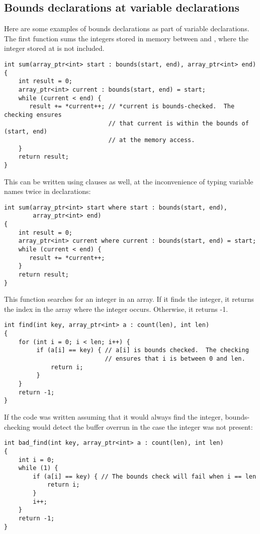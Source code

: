 \subsection{Bounds declarations at variable declarations}
\label{section:variable-declarations}

Here are some examples of bounds declarations as part of variable
declarations. The first function sums the integers stored in memory
between  and , where the integer stored at
 is not included.

\begin{lstlisting}
int sum(array_ptr<int> start : bounds(start, end), array_ptr<int> end)
{
    int result = 0;
    array_ptr<int> current : bounds(start, end) = start;
    while (current < end) {
       result += *current++; // *current is bounds-checked.  The checking ensures
                             // that current is within the bounds of (start, end)
                             // at the memory access.
    }
    return result;
}
\end{lstlisting}

This can be written using  clauses as well, at the
inconvenience of typing variable names twice in declarations:

\begin{lstlisting}
int sum(array_ptr<int> start where start : bounds(start, end),
        array_ptr<int> end)
{
    int result = 0;
    array_ptr<int> current where current : bounds(start, end) = start;
    while (current < end) {
       result += *current++;
    }
    return result;
}
\end{lstlisting}

This function searches for an integer in an array. If it finds the
integer, it returns the index in the array where the integer occurs.
Otherwise, it returns -1.

\begin{lstlisting}
int find(int key, array_ptr<int> a : count(len), int len)
{
    for (int i = 0; i < len; i++) {
         if (a[i] == key) { // a[i] is bounds checked.  The checking
                            // ensures that i is between 0 and len.
             return i;
         }
    }
    return -1;
}
\end{lstlisting}

If the code was written assuming that it would always find the integer,
bounds-checking would detect the buffer overrun in the case the integer
was not present:

\begin{lstlisting}
int bad_find(int key, array_ptr<int> a : count(len), int len)
{
    int i = 0;
    while (1) {
        if (a[i] == key) { // The bounds check will fail when i == len
            return i;
        }
        i++;
    }
    return -1;
}

\end{lstlisting}

